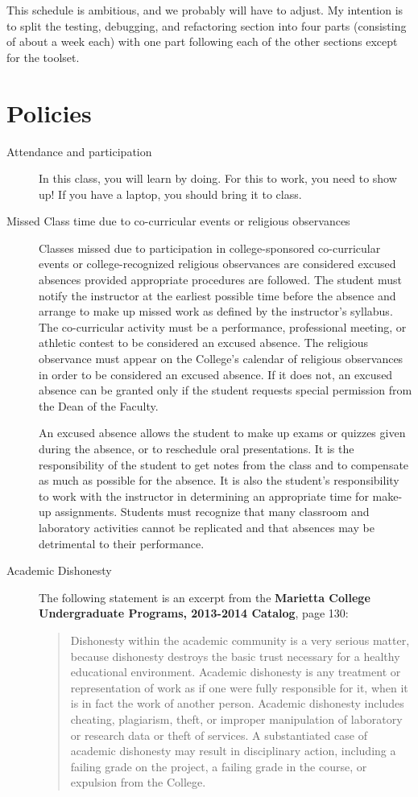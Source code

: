 \documentclass{tufte-handout}
\begin{document}
This schedule is ambitious, and we probably will have to adjust. My intention is to split the testing, debugging, and refactoring section into four parts (consisting of about a week each) with one part following each of the other sections except for the toolset.

\section{Policies}
\label{sec-6}
\begin{description}
\item[{Attendance and participation}] In this class, you will learn by doing. For this to work, you need to show up! If you have a laptop, you should bring it to class.

\item[{Missed Class time due to co-curricular events or religious observances}] Classes missed due to participation in
college-sponsored co-curricular events or college-recognized
religious observances are considered excused absences provided
appropriate procedures are followed.  The student must notify the
instructor at the earliest possible time before the absence and
arrange to make up missed work as defined by the instructor’s
syllabus.  The co-curricular activity must be a performance,
professional meeting, or athletic contest to be considered an
excused absence.  The religious observance must appear on the
College’s calendar of religious observances in order to be
considered an excused absence.  If it does not, an excused absence
can be granted only if the student requests special permission from
the Dean of the Faculty.

An excused absence allows the student to make up exams or quizzes
given during the absence, or to reschedule oral presentations.  It
is the responsibility of the student to get notes from the class and
to compensate as much as possible for the absence.  It is also the
student’s responsibility to work with the instructor in determining
an appropriate time for make-up assignments.  Students must
recognize that many classroom and laboratory activities cannot be
replicated and that absences may be detrimental to their
performance.

\item[{Academic Dishonesty}] The following statement is an excerpt from the \textbf{\textbf{Marietta
College Undergraduate Programs, 2013-2014 Catalog}}, page 130:

\begin{quote}
Dishonesty within the academic community is a very
serious matter, because dishonesty destroys the basic trust
necessary for a healthy educational environment. Academic
dishonesty is any treatment or representation of work as if one
were fully responsible for it, when it is in fact the work of
another person. Academic dishonesty includes cheating, plagiarism,
theft, or improper manipulation of laboratory or research data or
theft of services. A substantiated case of academic dishonesty may
result in disciplinary action, including a failing grade on the
project, a failing grade in the course, or expulsion from the
College.
\end{quote}


\end{description}
\end{document}
